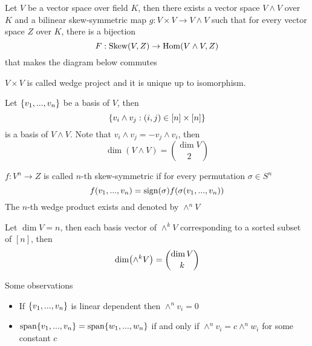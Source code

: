 \begin{proposition}
	Let $V$ be a vector space over field $K$, then there exists a vector space $V \wedge V$ over $K$ and a bilinear skew-symmetric map $g: V \times V \to V \wedge V$ such that for every vector space $Z$ over $K$, there is a bijection
	$$
	F: \operatorname{Skew}(V, Z) \to \operatorname{Hom}(V \wedge V, Z)
	$$
	that makes the diagram below commutes
	\begin{center}
	\end{center}
	
	$V \times V$ is called wedge project and it is unique up to isomorphism.
\end{proposition}

\begin{remark}
	Let $\{v_1, ..., v_n\}$ be a basis of $V$, then
	$$
	\{v_i \wedge v_j: (i, j) \in [n] \times [n]\}
	$$
	is a basis of $V \wedge V$. Note that $v_i \wedge v_j = - v_j \wedge v_i$, then
	$$
	\dim(V \wedge V) = {\dim V \choose 2}
	$$
\end{remark}

\begin{remark}
	$f: V^n \to Z$ is called $n$-th skew-symmetric if for every permutation $\sigma \in S^n$
	$$
	f(v_1, ..., v_n) = \operatorname{sign}(\sigma) f(\sigma(v_1, ..., v_n))
	$$
	The $n$-th wedge product exists and denoted by $\wedge^n V$
\end{remark}

\begin{remark}
	Let $\dim V = n$, then each basis vector of $\wedge^k V$ corresponding to a sorted subset of $[n]$, then
	$$
	\dim\tuple*{\wedge^k V} = {\dim V \choose k}
	$$
\end{remark}

\begin{proposition}
	Some observations
	\begin{itemize}
		\item If $\{v_1, ..., v_n\}$ is linear dependent then $\wedge^n v_i = 0$
		\item $\operatorname{span} \{v_1, ..., v_n\} = \operatorname{span} \{w_1, ..., w_n\}$ if and only if $\wedge^n v_i = c \wedge^n w_i$ for some constant $c$
	\end{itemize}
	
\end{proposition}

